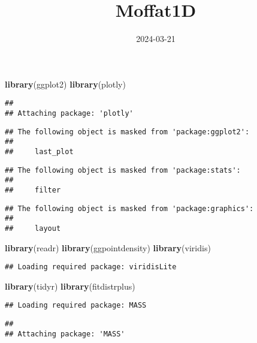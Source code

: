 \documentclass[
]{article}
\title{Moffat1D}
\author{}
\date{\vspace{-2.5em}2024-03-21}
\newenvironment{Shaded}{\begin{snugshade}}{\end{snugshade}}
\newcommand{\FunctionTok}[1]{\textcolor[rgb]{0.13,0.29,0.53}{\textbf{#1}}}
\newcommand{\NormalTok}[1]{#1}
\begin{document}
\maketitle

\begin{Shaded}
\begin{Highlighting}[]
\FunctionTok{library}\NormalTok{(ggplot2)}
\FunctionTok{library}\NormalTok{(plotly)}
\end{Highlighting}
\end{Shaded}

\begin{verbatim}
## 
## Attaching package: 'plotly'
\end{verbatim}

\begin{verbatim}
## The following object is masked from 'package:ggplot2':
## 
##     last_plot
\end{verbatim}

\begin{verbatim}
## The following object is masked from 'package:stats':
## 
##     filter
\end{verbatim}

\begin{verbatim}
## The following object is masked from 'package:graphics':
## 
##     layout
\end{verbatim}

\begin{Shaded}
\begin{Highlighting}[]
\FunctionTok{library}\NormalTok{(readr)}
\FunctionTok{library}\NormalTok{(ggpointdensity)}
\FunctionTok{library}\NormalTok{(viridis)}
\end{Highlighting}
\end{Shaded}

\begin{verbatim}
## Loading required package: viridisLite
\end{verbatim}

\begin{Shaded}
\begin{Highlighting}[]
\FunctionTok{library}\NormalTok{(tidyr)}
\FunctionTok{library}\NormalTok{(fitdistrplus)}
\end{Highlighting}
\end{Shaded}

\begin{verbatim}
## Loading required package: MASS
\end{verbatim}

\begin{verbatim}
## 
## Attaching package: 'MASS'
\end{verbatim}
\end{document}
